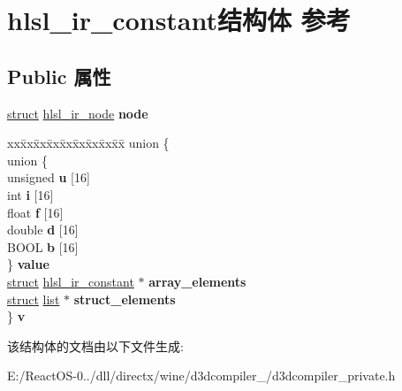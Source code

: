 \hypertarget{structhlsl__ir__constant}{}\section{hlsl\+\_\+ir\+\_\+constant结构体 参考}
\label{structhlsl__ir__constant}
\subsection*{Public 属性}
\begin{DoxyCompactItemize}
\item 
\mbox{\label{structhlsl__ir__constant_a53123b6990734338b7d18783eefa295e}} 
\hyperlink{interfacestruct}{struct} \hyperlink{structhlsl__ir__node}{hlsl\+\_\+ir\+\_\+node} {\bfseries node}
\item 
\mbox{\label{structhlsl__ir__constant_a79e73b1a3435d645c8f8cf2009a397e5}} 
\begin{tabbing}
xx\=xx\=xx\=xx\=xx\=xx\=xx\=xx\=xx\=\kill
union \{\\
\>union \{\\
\>\>unsigned {\bfseries u} \mbox{[}16\mbox{]}\\
\>\>int {\bfseries i} \mbox{[}16\mbox{]}\\
\>\>float {\bfseries f} \mbox{[}16\mbox{]}\\
\>\>double {\bfseries d} \mbox{[}16\mbox{]}\\
\>\>BOOL {\bfseries b} \mbox{[}16\mbox{]}\\
\>\} {\bfseries value}\\
\>\hyperlink{interfacestruct}{struct} \hyperlink{structhlsl__ir__constant}{hlsl\_ir\_constant} $\ast$ {\bfseries array\_elements}\\
\>\hyperlink{interfacestruct}{struct} \hyperlink{classlist}{list} $\ast$ {\bfseries struct\_elements}\\
\} {\bfseries v}\\

\end{tabbing}\end{DoxyCompactItemize}


该结构体的文档由以下文件生成\+:\begin{DoxyCompactItemize}
\item 
E\+:/\+React\+O\+S-\/0../dll/directx/wine/d3dcompiler\+\_/d3dcompiler\+\_\+private.\+h\end{DoxyCompactItemize}
